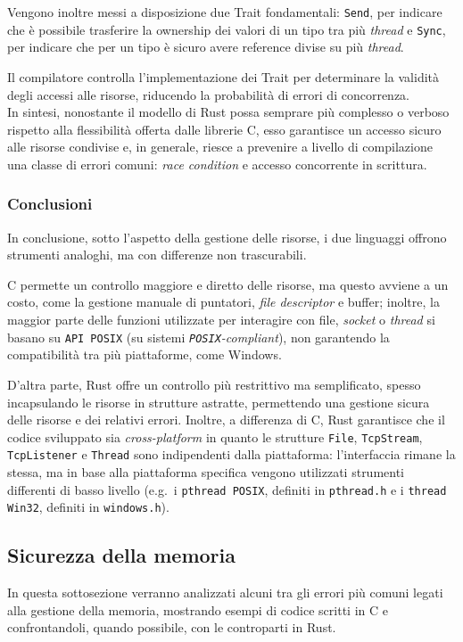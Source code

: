 Vengono inoltre messi a disposizione due Trait fondamentali: \texttt{Send}, per indicare che è possibile trasferire la ownership dei valori di un tipo tra più \textit{thread} e \texttt{Sync}, per indicare che per un tipo è sicuro avere reference divise su più \textit{thread}.

Il compilatore controlla l'implementazione dei Trait per determinare la validità degli accessi alle risorse, riducendo la probabilità di errori di concorrenza. \hfill
\vspace{10pt}\\
\noindent In sintesi, nonostante il modello di Rust possa semprare più complesso o verboso rispetto alla flessibilità offerta dalle librerie C, esso
garantisce un accesso sicuro alle risorse condivise e, in generale, riesce a prevenire a livello di compilazione una classe di errori comuni: \textit{race condition} e accesso concorrente in scrittura.

\subsubsection{Conclusioni}
In conclusione, sotto l'aspetto della gestione delle risorse, i due linguaggi offrono strumenti analoghi, ma con differenze non trascurabili.

C permette un controllo maggiore e diretto delle risorse, ma questo avviene a un costo, come la gestione manuale di puntatori, \textit{file descriptor}
 e buffer; inoltre, la maggior parte delle funzioni utilizzate per interagire con file, \textit{socket} o \textit{thread} si basano su \texttt{API POSIX} (su sistemi \textit{\texttt{POSIX}-compliant}), non garantendo la compatibilità 
tra più piattaforme, come Windows.

D'altra parte, Rust offre un controllo più restrittivo ma semplificato, spesso incapsulando le risorse in strutture astratte, permettendo una gestione sicura delle
 risorse e dei relativi
errori. Inoltre, a differenza di C, Rust garantisce che il codice sviluppato sia \textit{cross-platform} in quanto le strutture \texttt{File}, \texttt{TcpStream}, \texttt{TcpListener} e \texttt{Thread} 
sono indipendenti dalla piattaforma: l'interfaccia rimane la stessa, ma in base alla piattaforma specifica vengono utilizzati strumenti differenti di 
basso livello (e.g.\  i \texttt{pthread POSIX}, definiti in \texttt{pthread.h} e i \texttt{thread Win32}, definiti in \texttt{windows.h}).

\subsection{Sicurezza della memoria}\label{sub:mem-safe}
In questa sottosezione verranno analizzati alcuni tra gli errori più comuni legati alla gestione della memoria,
mostrando esempi di codice scritti in C e confrontandoli, quando possibile, con le controparti in Rust.

